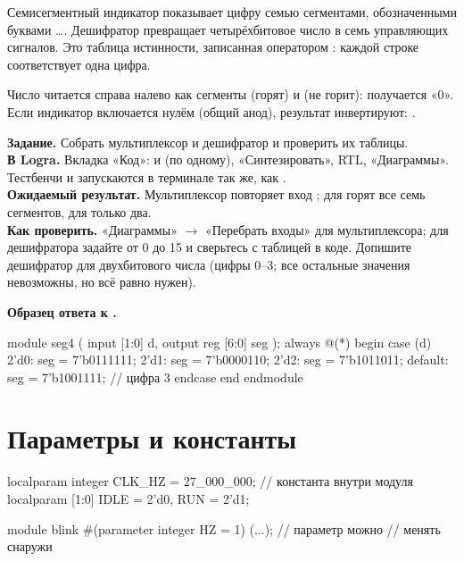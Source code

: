 Семисегментный индикатор показывает цифру семью сегментами, обозначенными
буквами \ldots{}. Дешифратор превращает четырёхбитовое число в
семь управляющих сигналов. Это таблица истинности, записанная оператором
: каждой строке соответствует одна цифра.


Число  читается справа налево как сегменты  (горят) и  (не горит): получается «0». Если индикатор включается
нулём (общий анод), результат инвертируют: .

\begin{diybox}
\textbf{Задание.} Собрать мультиплексор и дешифратор и проверить их таблицы.\\
\textbf{В Logra.} Вкладка «Код»:  и  (по одному),
«Синтезировать», RTL, «Диаграммы». Тестбенчи  и
 запускаются в терминале так же, как .\\
\textbf{Ожидаемый результат.} Мультиплексор повторяет вход ; для
 горят все семь сегментов, для  только два.\\
\textbf{Как проверить.} «Диаграммы» $\to$ «Перебрать входы» для мультиплексора;
для дешифратора задайте  от 0 до 15 и сверьтесь с таблицей в коде.
 Допишите дешифратор для двухбитового числа (цифры 0--3; все остальные
значения невозможны, но  всё равно нужен).
\end{diybox}

\textbf{Образец ответа к .}\par\nopagebreak
\begin{vcode}
module seg4 (
    input      [1:0] d,
    output reg [6:0] seg
);
    always @(*) begin
        case (d)
            2'd0:    seg = 7'b0111111;
            2'd1:    seg = 7'b0000110;
            2'd2:    seg = 7'b1011011;
            default: seg = 7'b1001111;   // цифра 3
        endcase
    end
endmodule
\end{vcode}


\section{Параметры и константы}

\begin{vcode}
localparam integer CLK_HZ = 27_000_000;  // константа внутри модуля
localparam [1:0]   IDLE = 2'd0, RUN = 2'd1;

module blink #(parameter integer HZ = 1) (...);  // параметр можно
                                                 // менять снаружи
\end{vcode}

